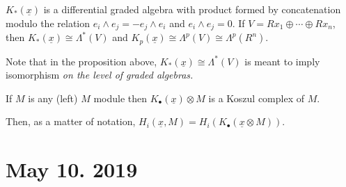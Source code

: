 \documentclass[12pt]{article}
\begin{document}
\begin{prop}
	$K_\ast(\underline{x})$ is a differential graded algebra with product formed by concatenation modulo
	the relation $e_i\wedge e_j=-e_j\wedge e_i$ and $e_i\wedge e_j=0$. If $V=Rx_1\oplus \cdots\oplus Rx_n$, then
	$K_\ast(\underline{x})\cong \Lambda^\ast(V)$ and $K_p(\underline{x})\cong\Lambda^p(V)\cong\Lambda^p(R^n)$.
\end{prop}
\begin{rmk}
	Note that in the proposition above, $K_\ast(\underline{x})\cong \Lambda^\ast(V)$ is meant to imply isomorphism \textit{on the level of graded algebras.}
\end{rmk}
\begin{defn}
	If $M$ is any (left) $M$ module then $K_\bullet(\underline{x})\otimes M$ is a Koszul complex of $M$.
\end{defn}
\begin{rmk}
	Then, as a matter of notation, $H_i(\underline{x},M)=H_i(K_\bullet(\underline{x}\otimes M))$.
\end{rmk}

\section{May 10. 2019}
\end{document}
